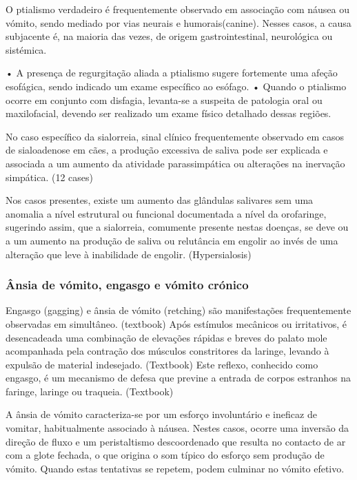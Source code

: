 O ptialismo verdadeiro é frequentemente observado em associação com náusea ou vómito, sendo mediado por vias neurais e humorais(canine). Nesses casos, a causa subjacente é, na maioria das vezes, de origem gastrointestinal, neurológica ou sistémica. \cite{ettinger_textbook_2010}


•	A presença de regurgitação aliada a ptialismo sugere fortemente uma afeção esofágica, sendo indicado um exame específico ao esófago.
•	Quando o ptialismo ocorre em conjunto com disfagia, levanta-se a suspeita de patologia oral ou maxilofacial, devendo ser realizado um exame físico detalhado dessas regiões. \cite{ettinger_textbook_2010}


No caso específico da sialorreia, sinal clínico frequentemente observado em casos de sialoadenose em cães, a produção excessiva de saliva pode ser explicada e associada a um aumento da atividade parassimpática ou alterações na inervação simpática. (12 cases) 


Nos casos presentes, existe um aumento das glândulas salivares sem uma anomalia a nível estrutural ou funcional documentada a nível da orofaringe, sugerindo assim, que a sialorreia, comumente presente nestas doenças, se deve ou a um aumento na produção de saliva ou relutância em engolir ao invés de uma alteração que leve à inabilidade de engolir. (Hypersialosis)

\subsubsection{Ânsia de vómito, engasgo e vómito crónico}

Engasgo (gagging) e ânsia de vómito (retching) são manifestações frequentemente observadas em simultâneo. (textbook) 
Após estímulos mecânicos ou irritativos, é desencadeada uma combinação de elevações rápidas e breves do palato mole acompanhada pela contração dos músculos constritores da laringe, levando à expulsão de material indesejado. (Textbook) Este reflexo, conhecido como engasgo, é um mecanismo de defesa que previne a entrada de corpos estranhos na faringe, laringe ou traqueia. (Textbook)


A ânsia de vómito caracteriza-se por um esforço involuntário e ineficaz de vomitar, habitualmente associado à náusea. Nestes casos, ocorre uma inversão da direção de fluxo e um peristaltismo descoordenado que resulta no contacto de ar com a glote fechada, o que origina o som típico do esforço sem produção de vómito. \cite{Das_Textbook} Quando estas tentativas se repetem, podem culminar no vómito efetivo. \cite{Das_Textbook}


